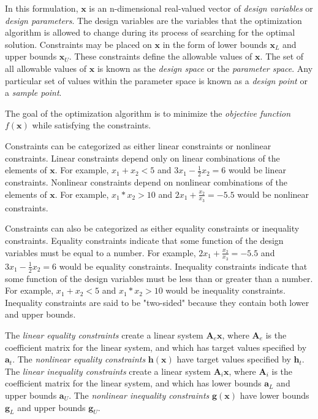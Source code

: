 In this formulation, $\textbf{x}$ is an n-dimensional real-valued vector of \textit{design variables} or \textit{design parameters}.
The design variables are the variables that the optimization algorithm is allowed to change during its process of searching for the optimal solution.
Constraints may be placed on $\textbf{x}$ in the form of lower bounds $\textbf{x}_L$ and upper bounds $\textbf{x}_U$.
These constraints define the allowable values of $\textbf{x}$.
The set of all allowable values of $\textbf{x}$ is known as the \textit{design space} or the \textit{parameter space}.
Any particular set of values within the parameter space is known as a \textit{design point} or a \textit{sample point}.

The goal of the optimization algorithm is to minimize the \textit{objective function} $f\left(\textbf{x}\right)$ while satisfying the constraints.

Constraints can be categorized as either linear constraints or nonlinear constraints.
Linear constraints depend only on linear combinations of the elements of $\textbf{x}$.
For example, $x_1 + x_2 < 5$ and $3x_1 - \frac{1}{2}x_2 = 6$ would be linear constraints.
Nonlinear constraints depend on nonlinear combinations of the elements of $\textbf{x}$.
For example, $x_1 * x_2 > 10$ and $2x_1 + \frac{x_2}{x_3} = -5.5$ would be nonlinear constraints.

Constraints can also be categorized as either equality constraints or inequality constraints.
Equality constraints indicate that some function of the design variables must be equal to a number.
For example, $2x_1 + \frac{x_2}{x_3} = -5.5$ and $3x_1 - \frac{1}{2}x_2 = 6$ would be equality constraints.
Inequality constraints indicate that some function of the design variables must be less than or greater than a number.
For example, $x_1 + x_2 < 5$ and $x_1 * x_2 > 10$ would be inequality constraints.
Inequality constraints are said to be "two-sided" because they contain both lower and upper bounds.

The \textit{linear equality constraints} create a linear system $\textbf{A}_e\textbf{x}$, where ${\textbf{A}_e}$ is the coefficient matrix for the linear system, and which has target values specified by ${\textbf{a}_t}$.
The \textit{nonlinear equality constraints} ${\textbf{h}\left(\textbf{x}\right)}$ have target values specified by $\textbf{h}_t$.
The \textit{linear inequality constraints} create a linear system $\textbf{A}_i\textbf{x}$, where ${\textbf{A}_i}$ is the coefficient matrix for the linear system, and which has lower bounds $\textbf{a}_L$ and upper bounds $\textbf{a}_U$.
The \textit{nonlinear inequality constraints} $\textbf{g}\left(\textbf{x}\right)$ have lower bounds $\textbf{g}_L$ and upper bounds $\textbf{g}_U$.

